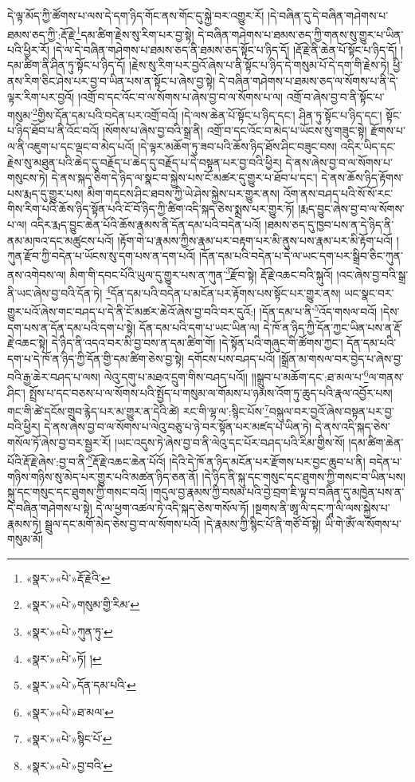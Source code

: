 དེ་ལྟ་མོད་ཀྱི་ཚོགས་པ་ལས་དེ་དག་ཉིད་གོང་ནས་གོང་དུ་སྐྱེ་བར་འགྱུར་རོ། །དེ་བཞིན་དུ་དེ་བཞིན་གཤེགས་པ་ཐམས་ཅད་ཀྱི་:རྡོ་རྗེ་\footnote{«སྣར་»«པེ་»རྡོ་རྗེའི་}དམ་ཚིག་རྗེས་སུ་རིག་པར་བྱ་སྟེ། དེ་བཞིན་གཤེགས་པ་ཐམས་ཅད་ཀྱི་གནས་སུ་གྱུར་པ་ཡིན་པའི་ཕྱིར་རོ། །དེ་ལ་དེ་བཞིན་གཤེགས་པ་ཐམས་ཅད་ནི་ཐམས་ཅད་སྟོང་པ་ཉིད་དོ། །རྡོ་རྗེ་ནི་ཆེན་པོ་སྟོང་པ་ཉིད་དོ། །དམ་ཚིག་ནི་ཤིན་ཏུ་སྟོང་པ་ཉིད་དོ། །རྗེས་སུ་རིག་པར་བྱའོ་ཞེས་པ་ནི་སྟོང་པ་ཉིད་དེ་གསུམ་པོ་དེ་དག་གི་རྗེས་ཏེ། ཕྱི་ནས་རིག་ཅིང་ཤེས་པར་བྱ་བ་ཡིན་པས་ན་སྟོང་པ་ཞེས་བྱ་སྟེ། དེ་བཞིན་གཤེགས་པ་ཐམས་ཅད་ལ་སོགས་པ་ནི་དེ་ལྟར་རིག་པར་བྱའོ། །འགྲོ་བ་དང་འོང་བ་ལ་སོགས་པ་ཞེས་བྱ་བ་ལ་སོགས་པ་ལ། འགྲོ་བ་ཞེས་བྱ་བ་ནི་སྟོང་པ་གསུམ་\footnote{«སྣར་»«པེ་»གསུམ་གྱི་རིམ་}གྱིས་དོན་དམ་པའི་བདེན་པར་འགྲོ་བའོ། །དེ་ལས་ཆེན་པོ་སྟོང་པ་ཉིད་དང་། ཤིན་ཏུ་སྟོང་པ་ཉིད་དང་། སྟོང་པ་ཉིད་ཐོབ་པ་ནི་འོང་བའོ། །སོགས་པ་ཞེས་བྱ་བའི་སྒྲ་ནི། འགྲོ་བ་དང་འོང་བ་མེད་པ་ཡོངས་སུ་གཟུང་སྟེ། རྫོགས་པ་ལ་ནི་འཇུག་པ་དང་ལྡང་བ་མེད་པའོ། །དེ་ལྟར་མཆོག་ཏུ་ཟབ་པའི་ཆོས་ཉིད་ཐོས་ཤིང་བཟུང་བས། འདིར་ཡིད་དང་རྗེས་སུ་མཐུན་པའི་ཆེད་དུ་བརྗོད་པ་ཆེད་དུ་བརྗོད་པ་དེ་བསྟན་པར་བྱ་བའི་ཕྱིར། དེ་ནས་ཞེས་བྱ་བ་ལ་སོགས་པ་གསུངས་ཏེ། དེ་ནས་སྐད་ཅིག་དེ་ཉིད་ལ་སྣང་བ་སྐྱེས་པས་ངོ་མཚར་དུ་གྱུར་པ་ཐོབ་པ་དང་། དེ་ནས་ཆོས་ཉིད་རྟོགས་པས་རྨད་དུ་གྱུར་པས། མིག་གདངས་ཤིང་ཐབས་ཀྱི་ཡེ་ཤེས་སྐྱེས་པར་གྱུར་ནས། འོག་ནས་བཤད་པའི་སོ་སོ་རང་གིས་རིག་པའི་ཆོས་ཉིད་སྟོན་པའི་ངོ་བོ་ཉིད་ཀྱི་ཚིག་འདི་སྐད་ཅེས་སྨྲས་པར་གྱུར་ཏོ། །རྨད་བྱུང་ཞེས་བྱ་བ་ལ་སོགས་པ་ལ། འདིར་རྨད་བྱུང་ཆེན་པོའི་ཆོས་རྣམས་ནི་དོན་དམ་པའི་བདེན་པའོ། །ཐམས་ཅད་དུ་ཁྱབ་པས་ན་དེ་ཉིད་ནི་ནམ་མཁའ་དང་མཚུངས་པའོ། །རྟོག་གེ་པ་རྣམས་ཀྱིས་རྣམ་པར་བརྟག་པར་མི་ནུས་པས་རྣམ་པར་མི་རྟོག་པའོ། །ཀུན་རྫོབ་ཀྱི་བདེན་པ་ཡོངས་སུ་དག་པས་ན་དག་པའོ། །དོན་དམ་པའི་བདེན་པ་དེ་ལ་ཡང་དག་པར་སྒྲིབ་ཅིང་ཀུན་ནས་འགེབས་ལ། མིག་གི་དབང་པོའི་ཡུལ་དུ་གྱུར་པས་ན་ཀུན་\footnote{«སྣར་»«པེ་»ཀུན་ཏུ་}རྫོབ་སྟེ། རྡོ་རྗེ་འཆང་བའི་སྐུའོ། །འང་ཞེས་བྱ་བའི་སྒྲ་ནི་ཡང་ཞེས་བྱ་བའི་དོན་ཏེ། \footnote{«སྣར་»«པེ་»ཏོ། ། }དོན་དམ་པའི་བདེན་པ་མངོན་པར་རྟོགས་པས་སྟོང་པར་གྱུར་ནས། ཡང་སྣང་བར་གྱུར་པའོ་ཞེས་གང་བཤད་པ་དེ་ནི་ངོ་མཚར་ཆེའོ་ཞེས་བྱ་བའི་བར་དུའོ:། །དོན་དམ་པ་ནི་\footnote{«སྣར་»«པེ་»དོན་དམ་པའི་}འོད་གསལ་བའོ། །དེས་དག་པས་ན་དོན་དམ་པའི་དག་པ་སྟེ། དོན་དམ་པའི་དག་པ་ཡང་ཡིན་ལ། དེ་ཁོ་ན་ཉིད་ཀྱི་དོན་ཀྱང་ཡིན་པས་ན་རྡོ་རྗེ་འཆང་སྟེ། དེ་ཉིད་ནི་འདའ་བར་མི་བྱ་བས་ན་དམ་ཚིག་གོ། །དེ་སྟོན་པའི་གཞུང་གི་ཚོགས་ཀྱང་། དོན་དམ་པའི་དག་པ་དེ་ཁོ་ན་ཉིད་ཀྱི་དོན་གྱི་དམ་ཚིག་ཅེས་བྱ་སྟེ། དགོངས་པས་བཤད་པའོ། །སྒྲོན་མ་གསལ་བར་བྱེད་པ་ཞེས་བྱ་བའི་རྒྱ་ཆེར་བཤད་པ་ལས། ལེའུ་དགུ་པ་མཐའ་དྲུག་གིས་བཤད་པའོ།། །།སྒྲུབ་པ་མཆོག་དང་:ཐ་མལ་པ་\footnote{«སྣར་»«པེ་»ཐ་མལ་}ལ་གནས་ཤིང་། སྤྲོས་པ་དང་བཅས་པ་ལ་སོགས་པའི་སྤྱོད་པ་གསུམ་ལ་གོམས་པ་ཉམས་འོག་ཏུ་ཆུད་པའི་རྣལ་འབྱོར་པས། གང་གི་ཚེ་དངོས་གྲུབ་རྙེད་པར་མ་གྱུར་ན་དེའི་ཚེ། རང་གི་ལྷ་ལ་:སྙིང་པོས་\footnote{«སྣར་»«པེ་»སྙིང་པོ་}བསྐུལ་བར་བྱའོ་ཞེས་བསྟན་པར་བྱ་བའི་ཕྱིར། དེ་ནས་ཞེས་བྱ་བ་ལ་སོགས་པ་ལེའུ་བཅུ་པ་ཉེ་བར་སྟོན་པར་མཛད་པ་ཡིན་ཏེ། དེ་ནས་འདི་སྐད་ཅེས་གསོལ་ཏོ་ཞེས་བྱ་བར་སྦྱར་རོ། །ཡང་འདུས་ཏེ་ཞེས་བྱ་བ་ནི་ལེའུ་དང་པོར་བཤད་པའི་རིམ་གྱིས་སོ། །དམ་ཚིག་ཆེན་པོའི་རྡོ་རྗེ་ཞེས་:བྱ་བ་ནི་\footnote{«སྣར་»«པེ་»བྱ་བའི་}རྡོ་རྗེ་འཆང་ཆེན་པོའོ། །དེའི་དེ་ཁོ་ན་ཉིད་མངོན་པར་རྫོགས་པར་བྱང་ཆུབ་པ་ནི། བདེན་པ་གཉིས་གཉིས་སུ་མེད་པར་གྱུར་པའི་མཚན་ཉིད་ཅན་ནོ། །དེ་ཉིད་ནི་སྐུ་དང་གསུང་དང་ཐུགས་ཀྱི་གསང་བ་ཡིན་པས། སྐུ་དང་གསུང་དང་ཐུགས་ཀྱི་གསང་བའོ། །གདུལ་བྱ་རྣམས་ཀྱི་བསམ་པའི་བྱེ་བྲག་ཇི་ལྟ་བ་བཞིན་དུ་མཁྱེན་པས་ན་དེ་བཞིན་གཤེགས་པ་སྟེ། དེ་ལ་ཕྱག་འཚལ་ཏེ་འདི་སྐད་ཅེས་གསོལ་ཏོ། །སྔགས་ནི་ཨཱ་ལི་དང་ཀཱ་ལི་ལས་སྐྱེས་པ་རྣམས་ཏེ། སྦྲུལ་དང་མགོ་མེད་ཅེས་བྱ་བ་ལ་སོགས་པའོ། །དེ་རྣམས་ཀྱི་སྙིང་པོ་ནི་གཙོ་བོ་སྟེ། ཡི་གེ་ཨོཾ་ལ་སོགས་པ་གསུམ་མོ། 